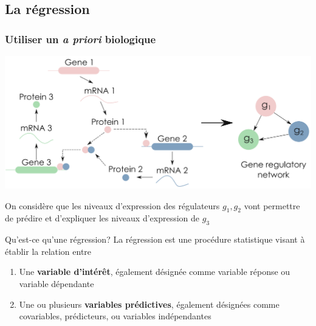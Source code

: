 \subsection{La régression}


	\begin{frame}
   \frametitle{Utiliser un \textbf{\textit{a priori} biologique}}
    	\vspace{-0.4cm}
    	\begin{center}
    	    \includegraphics[scale = 0.33]{Figures/Intro/network.PNG}
    	\end{center}
    	\scriptsize \cite{sanguinetti2019gene}
    	
    	
    	\begin{center}
\small    	
    	On considère que les niveaux d'expression des régulateurs $g_{1}, g_{2}$ vont permettre de prédire et d'expliquer les niveaux d'expression de $g_{3}$
    	\end{center}
	\end{frame}
	
	
	\begin{frame}{Qu'est-ce qu'une régression?}
	La régression est une procédure statistique visant à établir la relation entre
	
		\begin{enumerate}
		    \item Une \textbf{variable d'intérêt}, également désignée comme variable réponse ou variable dépendante
		    
		    \item Une ou plusieurs \textbf{variables prédictives}, également désignées comme covariables, prédicteurs, ou variables indépendantes
		\end{enumerate}
	\end{frame}
	
